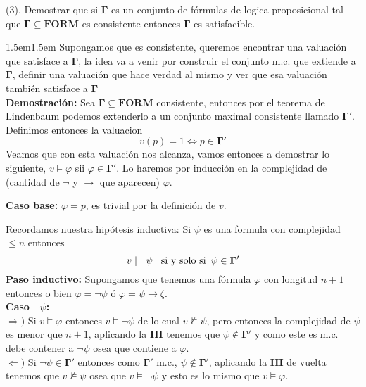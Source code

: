 \documentclass[leqno, 12pt, twoside,letterpaper]{book}
\theoremstyle{plain}
\theoremstyle{definition}
\newcommand{\bgamma}[0]{\bm{\Gamma}}
\newcommand{\FORM}[0]{\bm{FORM}}
\newcommand{\piz}[0]{\psi \rightarrow \zeta}
\newcounter{excounter}
\newenvironment{solucion}[0]{\begin{adjustwidth}{1.5em}{1.5em}}{\end{adjustwidth}}
\newenvironment{dem}[0]{\noindent\textbf{Demostración:}}{}
\newenvironment{ej}[1]{\noindent\stepcounter{excounter} \begin{exbox}\textbf{\arabic{excounter}} (#1).}{\end{exbox}}
\begin{document}
\begin{ej}{3}
    Demostrar que si $\bm{\Gamma}$ es un conjunto de fórmulas de logica proposicional
    tal que $\bm{\Gamma \subseteq FORM}$ es consistente entonces $\bm{\Gamma}$ es
    satisfacible.
\end{ej}

\begin{solucion}
Supongamos que es consistente, queremos encontrar una valuación que satisface a $\bgamma$, la idea va a venir por construir el conjunto m.c. que extiende a $\bgamma$, definir una valuación que hace verdad al mismo y ver que esa valuación también satisface a $\bgamma$ \\

\begin{dem}
Sea $\bgamma \subseteq \FORM$ consistente, entonces por el teorema de Lindenbaum podemos extenderlo a un
 conjunto maximal consistente llamado $\bgamma'$. Definimos entonces la valuacion
  \[ v(p) = 1  \Leftrightarrow p \in \bgamma' \]
Veamos que con esta valuación nos alcanza, vamos entonces a demostrar lo siguiente, $v \models \varphi$ sii $\varphi \in \bgamma'$. Lo haremos por inducción en la complejidad de (cantidad de $\lnot$ y $\rightarrow$ que aparecen) $\varphi$.

\noindent \textbf{Caso base:} $\varphi = p$, es trivial por la definición de $v$.

\noindent Recordamos nuestra hipótesis inductiva: Si $\psi$ es una formula con complejidad $\leq n$ entonces \[ v \models \psi \mbox{ \, si y solo si \,} \psi \in \bgamma' \]
\textbf{Paso inductivo:} Supongamos que tenemos una fórmula $\varphi$ con longitud $n + 1$ entonces o bien
$\varphi = \lnot \psi$ ó $\varphi = \piz$.\\

\noindent \textbf{Caso $\lnot \psi$:} \\ 
\noindent $\Rightarrow)$ Si $v \models \varphi$ entonces $v \models \lnot\psi$ de lo cual $v \not\models \psi$, pero entonces la complejidad de $\psi$ es menor que $n + 1$, aplicando la \textbf{HI} tenemos que $\psi \not\in \bgamma'$ y como este es m.c. debe contener a $\lnot\psi$ osea que contiene a $\varphi$. \\
\noindent $\Leftarrow)$ Si $\lnot\psi \in \bgamma'$ entonces como $\bgamma'$ m.c., $\psi \not\in \bgamma'$, aplicando la \textbf{HI} de vuelta tenemos que $v \not\models \psi$ osea que $v \models \lnot \psi$ y esto es lo mismo que $v \models \varphi$. \\


\end{dem}
\end{solucion}
\end{document}
